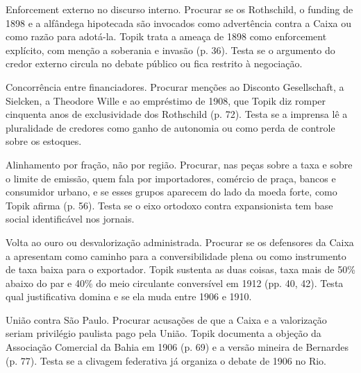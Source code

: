 \begin{dialogo}
\item Enforcement externo no discurso interno. Procurar se os Rothschild, o
funding de 1898 e a alfândega hipotecada são invocados como advertência contra a
Caixa ou como razão para adotá-la. Topik trata a ameaça de 1898 como enforcement
explícito, com menção a soberania e invasão (p. 36). Testa se o argumento do
credor externo circula no debate público ou fica restrito à negociação.

\item Concorrência entre financiadores. Procurar menções ao Disconto
Gesellschaft, a Sielcken, a Theodore Wille e ao empréstimo de 1908, que Topik diz
romper cinquenta anos de exclusividade dos Rothschild (p. 72). Testa se a
imprensa lê a pluralidade de credores como ganho de autonomia ou como perda de
controle sobre os estoques.

\item Alinhamento por fração, não por região. Procurar, nas peças sobre a taxa e
sobre o limite de emissão, quem fala por importadores, comércio de praça, bancos
e consumidor urbano, e se esses grupos aparecem do lado da moeda forte, como
Topik afirma (p. 56). Testa se o eixo ortodoxo contra expansionista tem base
social identificável nos jornais.

\item Volta ao ouro ou desvalorização administrada. Procurar se os defensores da
Caixa a apresentam como caminho para a conversibilidade plena ou como instrumento
de taxa baixa para o exportador. Topik sustenta as duas coisas, taxa mais de 50\%
abaixo do par e 40\% do meio circulante conversível em 1912 (pp. 40, 42). Testa
qual justificativa domina e se ela muda entre 1906 e 1910.

\item União contra São Paulo. Procurar acusações de que a Caixa e a valorização
seriam privilégio paulista pago pela União. Topik documenta a objeção da
Associação Comercial da Bahia em 1906 (p. 69) e a versão mineira de Bernardes
(p. 77). Testa se a clivagem federativa já organiza o debate de 1906 no Rio.
\end{dialogo}

